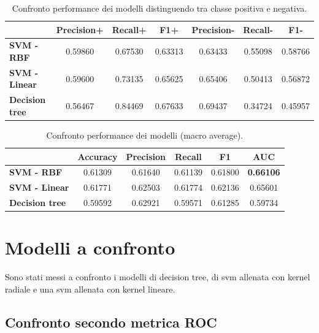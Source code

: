 \begin{table}[H]
	\begin{center}
		\begin{tabular}{ | l | c | c | c | c |  c | c |}
			\hline
			& \textbf{Precision+} & \textbf{Recall+} &\textbf{ F1+ }	& \textbf{Precision-} &\textbf{ Recall-} & \textbf{F1-} \\
			\hline
			\textbf{SVM - RBF} & 0.59860 & 0.67530  & 0.63313 &
												    0.63433 & 0.55098 & 0.58766\\
			\textbf{SVM - Linear} & 0.59600 & 0.73135 & 0.65625&
													0.65406 & 0.50413 & 0.56872\\
			\textbf{Decision tree} & 0.56467&  0.84469 & 0.67633 & 
										0.69437 & 0.34724 & 0.45957 \\
			\hline
		\end{tabular}
	\end{center}
	\caption{Confronto performance dei modelli distinguendo tra classe positiva e negativa.}
\end{table}




\begin{table}[H]
	\begin{center}
		\begin{tabular}{ | l | c | c | c | c |  c |}
			\hline
			& \textbf{Accuracy} & \textbf{Precision} &\textbf{ Recall }	& \textbf{F1} &\textbf{ AUC} \\
			\hline
			\textbf{SVM - RBF} & 0.61309 & 0.61640 & 0.61139  & 0.61800 & \textbf{0.66106} \\
			\textbf{SVM - Linear} & 0.61771 & 0.62503 & 0.61774 & 0.62136 & 0.65601 \\
			\textbf{Decision tree} & 0.59592 & 0.62921 & 0.59571 	& 0.61285 & 0.59734\\
			\hline
		\end{tabular}
	\end{center}
	\caption{Confronto performance dei modelli (macro average).}
\end{table}


\section{Modelli a confronto}
Sono stati messi a confronto i modelli di decision tree, di svm
allenata con kernel radiale e una svm allenata con kernel lineare.

\subsection{Confronto secondo metrica ROC}

